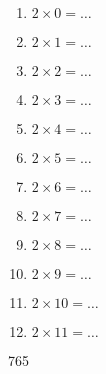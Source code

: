 \documentclass[11pt]{article}
\begin{document}
\begin{exercice}[1]
\begin{multicols}{2}
\begin{enumerate}[label=""]
\item $2 \times 0 = \ldots$
\item $2 \times 1 = \ldots$
\item $2 \times 2 = \ldots$
\item $2 \times 3 = \ldots$
\item $2 \times 4 = \ldots$
\item $2 \times 5 = \ldots$
\item $2 \times 6 = \ldots$
\item $2 \times 7 = \ldots$
\item $2 \times 8 = \ldots$
\item $2 \times 9 = \ldots$
\item $2 \times 10 = \ldots$
\item $2 \times 11 = \ldots$
\end{enumerate}

\columnbreak

765
\end{multicols}
\end{exercice}
\end{document}
